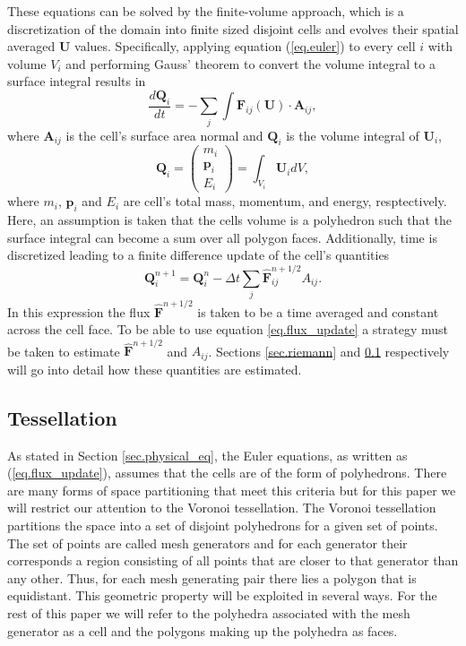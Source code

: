 These equations can be solved by the finite-volume approach, which is a
discretization of the domain into finite sized disjoint cells and evolves their
spatial averaged $\mathbf{U}$ values. Specifically, applying equation
(\ref{eq.euler}) to every cell $i$ with volume $V_i$ and performing Gauss'
theorem to convert the volume integral to a surface integral results in
%
\begin{equation}
    \label{eq.euler_int}
    \frac{d\mathbf{Q}_i}{dt} =
    -\sum_{j}\int\mathbf{F}_{ij}(\mathbf{U})\cdot\mathbf{A}_{ij},
\end{equation}
%
where $\mathbf{A}_{ij}$ is the cell's surface area normal and $\mathbf{Q}_i$
is the volume integral of $\mathbf{U}_i$,
%
\begin{equation}
	\mathbf{Q}_i =
    \left(
    \begin{array}{c}
    	m_i \\
        \mathbf{p}_i \\
        E_i
     \end{array}
     \right) = \int_{V_i}\mathbf{U}_i dV,
\end{equation}
where $m_i$, $\mathbf{p}_i$ and $E_i$ are cell's total mass, momentum, and
energy, resptectively. Here, an assumption is taken that the cells volume
is a polyhedron such that the surface integral can become a sum over all
polygon faces. Additionally, time is discretized leading to a finite difference
update of the cell's quantities
%
\begin{equation}
    \label{eq.flux_update}
    \mathbf{Q}_i^{n+1} = \mathbf{Q}_i^n - \Delta t\sum_j
    \mathbf{\hat{F}}_{ij}^{n+1/2} A_{ij}.
\end{equation}
%
In this expression the flux $\mathbf{\hat{F}}^{n+1/2}$ is taken to be a time
averaged and constant across the cell face. To be able to use equation
\ref{eq.flux_update} a strategy must be taken to estimate
$\mathbf{\hat{F}}^{n+1/2}$ and $A_{ij}$. Sections \ref{sec.riemann} and
\ref{sec.tessellation} respectively will go into detail how these quantities are
estimated.

\subsection{Tessellation}
\label{sec.tessellation}
As stated in Section \ref{sec.physical_eq}, the Euler equations, as written as
(\ref{eq.flux_update}), assumes that the cells are of the form of polyhedrons.
There are many forms of space partitioning that meet this criteria but for this
paper we will restrict our attention to the Voronoi tessellation. The Voronoi
tessellation partitions the space into a set of disjoint polyhedrons for a
given set of points. The set of points are called mesh generators and for each
generator their corresponds a region consisting of all points that are closer
to that generator than any other. Thus, for each mesh generating pair there
lies a polygon that is equidistant. This geometric property will be exploited
in several ways. For the rest of this paper we will refer to the polyhedra
associated with the mesh generator as a cell and the polygons making up the
polyhedra as faces.

